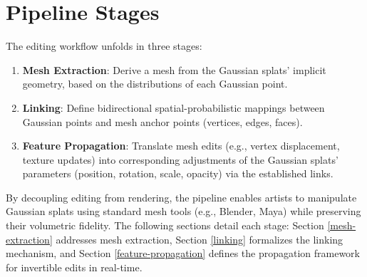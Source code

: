 \section*{Pipeline Stages}
The editing workflow unfolds in three stages:
\begin{enumerate}
    \item \textbf{Mesh Extraction}: Derive a mesh from the Gaussian splats' implicit geometry, based on the distributions of each Gaussian point.
    \item \textbf{Linking}: Define bidirectional spatial-probabilistic mappings between Gaussian points and mesh anchor points (vertices, edges, faces).
    \item \textbf{Feature Propagation}: Translate mesh edits (e.g., vertex displacement, texture updates) into corresponding adjustments of the Gaussian splats' parameters (position, rotation, scale, opacity) via the established links.
\end{enumerate}

By decoupling editing from rendering, the pipeline enables artists to manipulate Gaussian splats using standard mesh tools (e.g., Blender, Maya) while preserving their volumetric fidelity. The following sections detail each stage: Section \ref{mesh-extraction} addresses mesh extraction, Section \ref{linking} formalizes the linking mechanism, and Section \ref{feature-propagation} defines the propagation framework for invertible edits in real-time.


